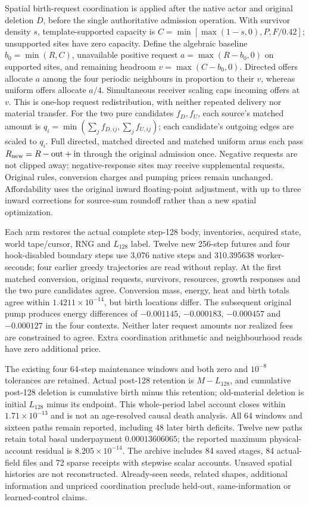 Spatial birth-request coordination is applied after the native actor and original deletion $D$, before the single authoritative admission operation. With survivor density $s$, template-supported capacity is $C=\min[\max(1-s,0),P,F/0.42]$; unsupported sites have zero capacity. Define the algebraic baseline $b_0=\min(R,C)$, unavailable positive request $a=\max(R-b_0,0)$ on supported sites, and remaining headroom $v=\max(C-b_0,0)$. Directed offers allocate $a$ among the four periodic neighbours in proportion to their $v$, whereas uniform offers allocate $a/4$. Simultaneous receiver scaling caps incoming offers at $v$. This is one-hop request redistribution, with neither repeated delivery nor material transfer. For the two pure candidates $f_D,f_U$, each source's matched amount is $q_i=\min(\sum_j f_{D,ij},\sum_j f_{U,ij})$; each candidate's outgoing edges are scaled to $q_i$. Full directed, matched directed and matched uniform arms each pass $R_{\rm new}=R-\mathrm{out}+\mathrm{in}$ through the original admission once. Negative requests are not clipped away; negative-response sites may receive supplemental requests. Original rules, conversion charges and pumping prices remain unchanged. Affordability uses the original inward floating-point adjustment, with up to three inward corrections for source-sum roundoff rather than a new spatial optimization.

Each arm restores the actual complete step-128 body, inventories, acquired state, world tape/cursor, RNG and $L_{128}$ label. Twelve new 256-step futures and four hook-disabled boundary steps use 3,076 native steps and 310.395638 worker-seconds; four earlier greedy trajectories are read without replay. At the first matched conversion, original requests, survivors, resources, growth responses and the two pure candidates agree. Conversion mass, energy, heat and birth totals agree within $1.4211\times10^{-14}$, but birth locations differ. The subsequent original pump produces energy differences of $-0.001145$, $-0.000183$, $-0.000457$ and $-0.000127$ in the four contexts. Neither later request amounts nor realized fees are constrained to agree. Extra coordination arithmetic and neighbourhood reads have zero additional price.

The existing four 64-step maintenance windows and both zero and $10^{-8}$ tolerances are retained. Actual post-128 retention is $M-L_{128}$, and cumulative post-128 deletion is cumulative birth minus this retention; old-material deletion is initial $L_{128}$ minus its endpoint. This whole-period label account closes within $1.71\times10^{-13}$ and is not an age-resolved causal death analysis. All 64 windows and sixteen paths remain reported, including 48 later birth deficits. Twelve new paths retain total basal underpayment $0.00013606065$; the reported maximum physical-account residual is $8.205\times10^{-14}$. The archive includes 84 saved stages, 84 actual-field files and 72 sparse receipts with stepwise scalar accounts. Unsaved spatial histories are not reconstructed. Already-seen seeds, related shapes, additional information and unpriced coordination preclude held-out, same-information or learned-control claims.

